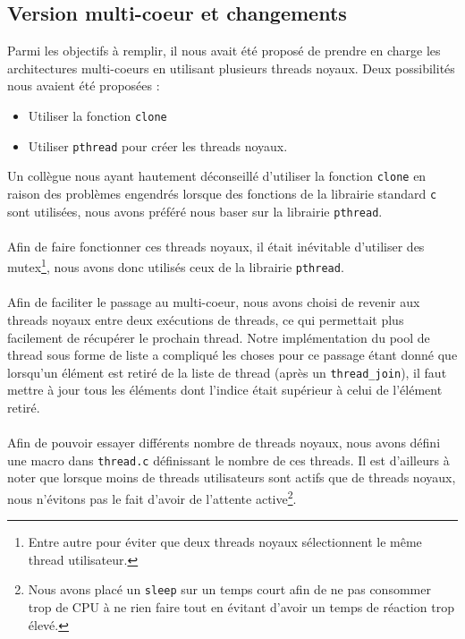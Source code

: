 \documentclass{article}
\begin{document}
		\subsection{Version multi-coeur et changements}
		Parmi les objectifs à remplir, il nous avait été proposé de prendre
        en charge les architectures multi-coeurs en utilisant plusieurs
        threads noyaux. Deux possibilités nous avaient été proposées :
        \begin{itemize}
          \item Utiliser la fonction \verb!clone!
          \item Utiliser \verb!pthread! pour créer les threads noyaux.
        \end{itemize}
        Un collègue nous ayant hautement déconseillé d'utiliser la fonction
        \verb!clone! en raison des problèmes engendrés lorsque des fonctions
        de la librairie standard \verb!c! sont utilisées, nous avons préféré
        nous baser sur la librairie \verb!pthread!.
        \paragraph{}
        Afin de faire fonctionner ces threads noyaux, il était inévitable
        d'utiliser des mutex\footnote{Entre autre pour éviter que deux
          threads noyaux sélectionnent le même thread utilisateur.}, nous
        avons donc utilisés ceux de la librairie \verb!pthread!. 
        \paragraph{}
        Afin de faciliter le passage au multi-coeur, nous avons choisi
        de revenir aux threads noyaux entre deux exécutions de threads, ce
        qui permettait plus facilement de récupérer le prochain thread. Notre
        implémentation du pool de thread sous forme de liste a compliqué les
        choses pour ce passage étant donné que lorsqu'un élément est retiré
        de la liste de thread (après un \verb!thread_join!), il faut mettre
        à jour tous les éléments dont l'indice était supérieur à celui de
        l'élément retiré.
        \paragraph{}
        Afin de pouvoir essayer différents nombre de threads noyaux, nous
        avons défini une macro dans \verb!thread.c! définissant le nombre
        de ces threads. Il est d'ailleurs à noter que lorsque moins de
        threads utilisateurs sont actifs que de threads noyaux, nous
        n'évitons pas le fait d'avoir de l'attente active\footnote{Nous avons
          placé un \verb!sleep! sur un temps court afin de ne pas consommer
          trop de CPU à ne rien faire tout en évitant d'avoir un temps de
          réaction trop élevé.}.
\end{document}

